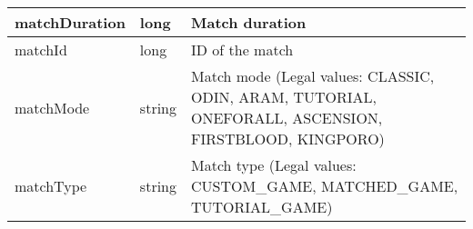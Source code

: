 \begin{table}[!h]
\begin{tabular}{llp{5cm}}
matchDuration         & long                          & Match duration                                                                                                                                                                                                                                                                                                                                                                                                                                                                                                                                                                                                                          \\ \hline
matchId               & long                          & ID of the match                                                                                                                                                                                                                                                                                                                                                                                                                                                                                                                                                                                                                         \\ \hline
matchMode             & string                        & Match mode (Legal values: CLASSIC, ODIN, ARAM, TUTORIAL, ONEFORALL, ASCENSION, FIRSTBLOOD, KINGPORO)                                                                                                                                                                                                                                                                                                                                                                                                                                                                                                                                    \\ \hline
matchType             & string                        & Match type (Legal values: CUSTOM\_GAME, MATCHED\_GAME, TUTORIAL\_GAME)                                                                                                                                                                                                                                                                                                                                                                                                                                                                                                                                                                  \\ \hline

\end{tabular}
\end{table}
